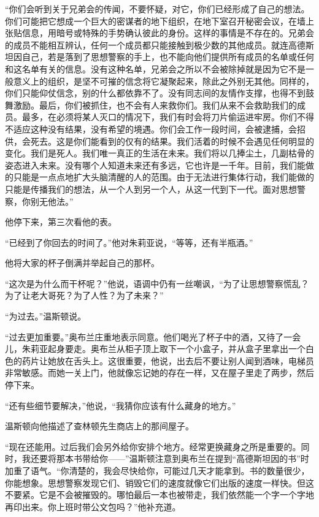 ``你们会听到关于兄弟会的传闻，不要怀疑，对它，你们已经形成了自己的想法。你们可能把它想成一个巨大的密谋者的地下组织，在地下室召开秘密会议，在墙上张贴信息，用暗号或特殊的手势确认彼此的身份。这样的事情是不存在的。兄弟会的成员不能相互辨认，任何一个成员都只能接触到极少数的其他成员。就连高德斯坦因自己，若是落到了思想警察的手上，也不能向他们提供所有成员的名单或任何和这名单有关的信息。没有这种名单，兄弟会之所以不会被除掉就是因为它不是一般意义上的组织，是坚不可摧的信念将它凝聚起来，除此之外别无其他。同样的，你们只能仰仗信念，别的什么都依靠不了。没有同志间的友情作支撑，也得不到鼓舞激励。最后，你们被抓住，也不会有人来救你们。我们从来不会救助我们的成员。最多，在必须将某人灭口的情况下，我们有时会将刀片偷运进牢房。你们不得不适应这种没有结果，没有希望的境遇。你们会工作一段时间，会被逮捕，会招供，会死去。这是你们能看到的仅有的结果。我们活着的时候不会遇见任何明显的变化。我们是死人。我们唯一真正的生活在未来。我们将以几捧尘土，几副枯骨的姿态进入未来。没有哪个人知道未来还有多远，它也许是一千年。目前，我们能做的只能是一点点地扩大头脑清醒的人的范围。由于无法进行集体行动，我们能做的只能是传播我们的想法，从一个人到另一个人，从这一代到下一代。面对思想警察，你别无他法。''

他停下来，第三次看他的表。

``已经到了你回去的时间了。''他对朱莉亚说，``等等，还有半瓶酒。''

他将大家的杯子倒满并举起自己的那杯。

``这次是为什么而干杯呢？''他说，语调中仍有一丝嘲讽，``为了让思想警察慌乱？为了让老大哥死？为了人性？为了未来？''

``为过去。''温斯顿说。

``过去更加重要。''奥布兰庄重地表示同意。他们喝光了杯子中的酒，又待了一会儿，朱莉亚起身要走。奥布兰从柜子顶上取下一个小盒子，并从盒子里拿出一个白色的药片让她放在舌头上。这很重要，他说，出去后不要让别人闻到酒味，电梯员非常敏感。而她一关上门，他就像忘记她的存在一样，又在屋子里走了两步，然后停下来。

``还有些细节要解决，''他说，``我猜你应该有什么藏身的地方。''

温斯顿向他描述了查林顿先生商店上的那间屋子。

``现在还能用。过后我们会另外给你安排个地方。经常更换藏身之所是重要的。同时，我还要将那本书带给你------''温斯顿注意到奥布兰在提到``高德斯坦因的书''时加重了语气。``你清楚的，我会尽快给你，可能过几天才能拿到。书的数量很少，你能想象。思想警察发现它们、销毁它们的速度就像它们出版的速度一样快。但这不要紧。它是不会被摧毁的。哪怕最后一本也被带走，我们依然能一个字一个字地再印出来。你上班时带公文包吗？''他补充道。

